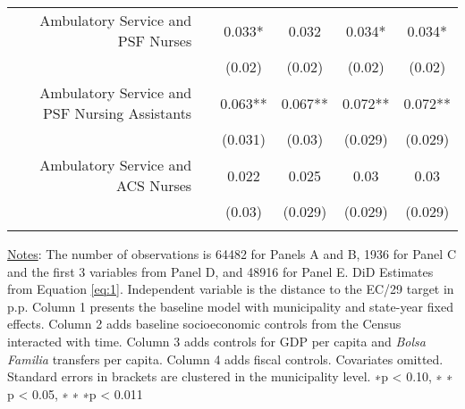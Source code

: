 \begin{table}[h]
\begin{footnotesize}
\begin{center}
{\begin{threeparttable}[b]
\begin{tabular}{rrcccc}
    \multicolumn{1}{p{29.785em}}{Ambulatory Service and PSF Nurses} &       & 0.033* & 0.032 & 0.034* &  0.034*  \\
          &       & (0.02) & (0.02) & (0.02) &  (0.02)  \\
    \multicolumn{1}{p{29.785em}}{Ambulatory Service and PSF Nursing Assistants} &       & 0.063** & 0.067** & 0.072** &  0.072**  \\
          &       & (0.031) & (0.03) & (0.029) &  (0.029)  \\
    \multicolumn{1}{p{29.785em}}{Ambulatory Service and ACS Nurses} &       & 0.022 & 0.025 & 0.03  &  0.03  \\
          &       & (0.03) & (0.029) & (0.029) &  (0.029)  \\
          &       &       &       &       &  \\
    \bottomrule
    \bottomrule
    \end{tabular}%
    
    
  \label{table:infra}%
  
  \begin{tablenotes}
  \scriptsize{\underline{Notes}: The number of observations is 64482 for Panels A and B,  1936 for Panel C and the first 3 variables from Panel D, and 48916 for Panel E.  DiD Estimates from Equation \ref{eq:1}. Independent variable is the distance to the EC/29 target in p.p. Column 1 presents the baseline model with municipality and state-year fixed effects. Column 2 adds baseline socioeconomic controls from the Census interacted with time. Column 3 adds controls for GDP per capita and \emph{Bolsa Familia} transfers per capita. Column 4 adds fiscal controls. Covariates omitted. Standard errors in brackets are clustered in the municipality level. ∗p < 0.10, ∗ ∗ p < 0.05, ∗ ∗ ∗p < 0.011}
  \end{tablenotes}

\end{threeparttable}
}
\end{center}
\end{footnotesize}
\end{table}